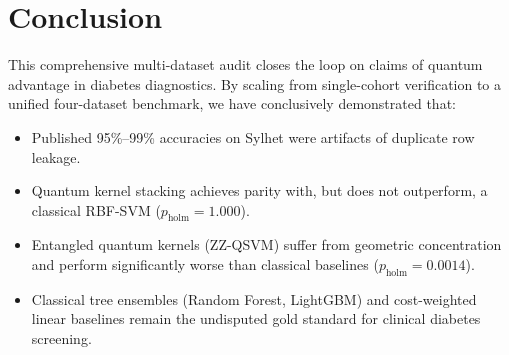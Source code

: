 \documentclass[11pt,a4paper]{article}
\begin{document}
\section{Conclusion}
This comprehensive multi-dataset audit closes the loop on claims of quantum advantage in diabetes diagnostics. By scaling from single-cohort verification to a unified four-dataset benchmark, we have conclusively demonstrated that:
\begin{itemize}[leftmargin=1.5em]
    \item Published 95\%--99\% accuracies on Sylhet were artifacts of duplicate row leakage.
    \item Quantum kernel stacking achieves parity with, but does not outperform, a classical RBF-SVM ($p_{\text{holm}} = 1.000$).
    \item Entangled quantum kernels (ZZ-QSVM) suffer from geometric concentration and perform significantly worse than classical baselines ($p_{\text{holm}} = 0.0014$).
    \item Classical tree ensembles (Random Forest, LightGBM) and cost-weighted linear baselines remain the undisputed gold standard for clinical diabetes screening.
\end{itemize}
\end{document}
